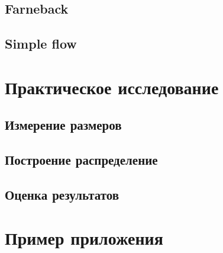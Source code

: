 \documentclass[specification,annotation,times]{itmo-student-thesis}
\begin{document}
\section{Farneback}
\section{Simple flow}
\chapterconclusion
\chapter{Практическое исследование}
\section{Измерение размеров}
\section{Построение распределение}
\section{Оценка результатов}
\startconclusionpage


\printmainbibliography

\appendix

\chapter{Пример приложения}
 
\end{document}
